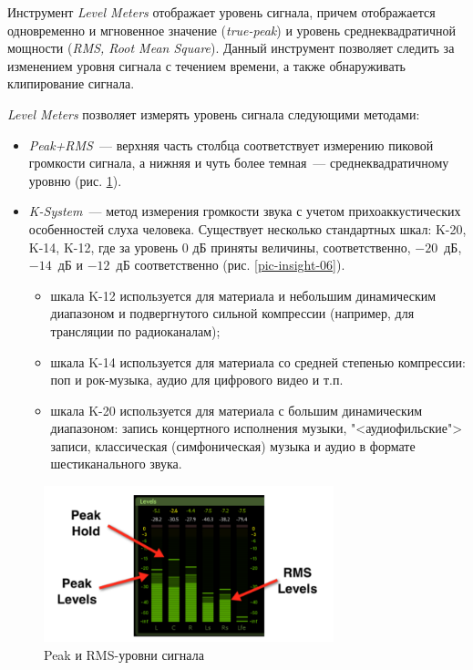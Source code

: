 \documentclass[oneside, final, 14pt]{extreport}
\begin{document}
Инструмент \textit{Level Meters} отображает уровень сигнала, причем отображается одновременно и мгновенное значение (\textit{true-peak}) и уровень среднеквадратичной мощности (\textit{RMS, Root Mean Square}). Данный инструмент позволяет следить за изменением уровня сигнала с течением времени, а также обнаруживать клипирование сигнала.

\textit{Level Meters} позволяет измерять уровень сигнала следующими методами:
\begin{itemize}
\item \textit{Peak+RMS}~--- верхняя часть столбца соответствует измерению пиковой громкости сигнала, а нижняя и чуть более темная~--- среднеквадратичному уровню (рис. \ref{pic-insight-05}).
\item \textit{K-System}~--- метод измерения громкости звука с учетом прихоаккустических особенностей слуха человека. Существует несколько стандартных шкал: K-20, K-14, K-12, где за уровень 0 дБ приняты величины, соответственно, $-20$~дБ, $-14$~дБ и $-12$~дБ соответственно (рис. \ref{pic-insight-06}).
  \begin{itemize}
  	\item шкала K-12 используется для материала и небольшим динамическим диапазоном и подвергнутого сильной компрессии (например, для трансляции по радиоканалам);
  	\item шкала K-14 используется для материала со средней степенью компрессии: поп и рок-музыка, аудио для цифрового видео и т.п.
  	\item шкала K-20 используется для материала с большим динамическим диапазоном: запись концертного исполнения музыки, "<аудиофильские"> записи, классическая (симфоническая) музыка и аудио в формате шестиканального звука.
  \end{itemize}
\end{itemize}

\begin{figure}[h!]
\centering
\includegraphics[width=0.75\textwidth]{pic-insight-05}
\caption{Peak и RMS-уровни сигнала}
\label{pic-insight-05}
\end{figure}
\end{document}
